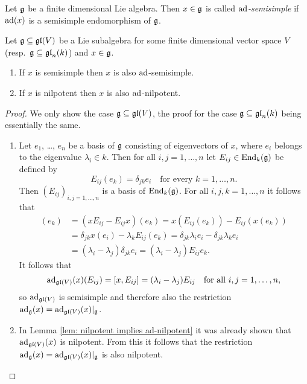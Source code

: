 \begin{defi}
 Let $\mathfrak{g}$ be a finite dimensional Lie algebra. Then $x \in \mathfrak{g}$ is called \emph{$\operatorname{ad}$-semisimple} if $\operatorname{ad}(x)$ is a semisimple endomorphism of $\mathfrak{g}$.
\end{defi}


\begin{lem}
 Let $\mathfrak{g} \subseteq \mathfrak{gl}(V)$ be a Lie subalgebra for some finite dimensional vector space $V$ (resp.\ $\mathfrak{g} \subseteq \mathfrak{gl}_n(k)$) and $x \in \mathfrak{g}$.
 \begin{enumerate}
  \item
   If $x$ is semisimple then $x$ is also $\operatorname{ad}$-semisimple.
  \item
   If $x$ is nilpotent then $x$ is also $\operatorname{ad}$-nilpotent.
 \end{enumerate}
\end{lem}
\begin{proof}
 We only show the case $\mathfrak{g} \subseteq \mathfrak{gl}(V)$, the proof for the case $\mathfrak{g} \subseteq \mathfrak{gl}_n(k)$ being essentially the same.
 \begin{enumerate}[leftmargin=*]
  \item
   Let $e_1$, \dots, $e_n$ be a basis of $\mathfrak{g}$ consisting of eigenvectors of $x$, where $e_i$ belongs to the eigenvalue $\lambda_i \in k$. Then for all \mbox{$i,j = 1, \dotsc, n$} let $E_{ij} \in \operatorname{End}_k(\mathfrak{g})$ be defined by
   \[
    E_{ij}(e_k) = \delta_{jk} e_i \quad \text{for every $k = 1, \dotsc, n$}.
   \]
   Then $(E_{ij})_{i,j=1,\dotsc,n}$ is a basis of $\operatorname{End}_k(\mathfrak{g})$. For all $i,j,k = 1, \dotsc, n$ it follows that
   \begin{align*}
    [x,E_{ij}](e_k)
    &= (x E_{ij} - E_{ij} x)(e_k)
    = x(E_{ij}(e_k)) - E_{ij}(x(e_k)) \\
    &= \delta_{jk} x(e_i) - \lambda_k E_{ij}(e_k)
    = \delta_{jk} \lambda_i e_i - \delta_{jk} \lambda_k e_i \\
    &= (\lambda_i - \lambda_j) \delta_{jk} e_i
    = (\lambda_i - \lambda_j) E_{ij} e_k.
   \end{align*}
   It follows that
   \[
    \operatorname{ad}_{\mathfrak{gl}(V)}(x)(E_{ij}) = [x,E_{ij}] = (\lambda_i - \lambda_j) E_{ij}
    \quad \text{for all $i,j = 1, \dotsc, n$},
   \]
   so $\operatorname{ad}_{\mathfrak{gl}(V)}$ is semisimple and therefore also the restriction $\operatorname{ad}_{\mathfrak{g}}(x) = \operatorname{ad}_{\mathfrak{gl}(V)}(x)|_{\mathfrak{g}}$.
   
  \item
   In Lemma \ref{lem: nilpotent implies ad-nilpotent} it was already shown that $\operatorname{ad}_{\mathfrak{gl}(V)}(x)$ is nilpotent. From this it follows that the restriction $\operatorname{ad}_{\mathfrak{g}}(x) = \operatorname{ad}_{\mathfrak{gl}(V)}(x)|_{\mathfrak{g}}$ is also nilpotent.
  \qedhere
 \end{enumerate}
\end{proof}












